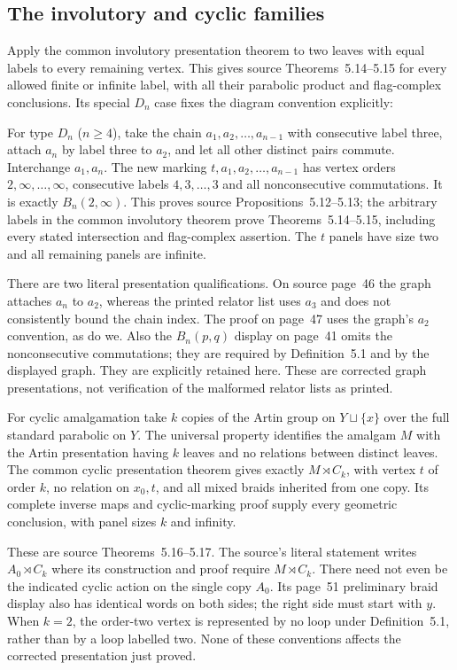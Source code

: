\subsection{The involutory and cyclic families}
Apply the common involutory presentation theorem to two leaves with equal labels to every remaining vertex. This gives source Theorems~5.14--5.15 for every allowed finite or infinite label, with all their parabolic product and flag-complex conclusions. Its special $D_n$ case fixes the diagram convention explicitly:

For type $D_n$ ($n\geq4$), take the chain $a_1,a_2,\ldots,a_{n-1}$
with consecutive label three, attach $a_n$ by label three to $a_2$,
and let all other distinct pairs commute. Interchange $a_1,a_n$.
The new marking $t,a_1,a_2,\ldots,a_{n-1}$ has vertex orders
$2,\infty,\ldots,\infty$, consecutive labels $4,3,\ldots,3$ and
all nonconsecutive commutations. It is exactly $B_n(2,\infty)$.
This proves source Propositions~5.12--5.13; the arbitrary labels in the common involutory theorem
prove Theorems~5.14--5.15, including every stated intersection and
flag-complex assertion. The $t$ panels have size two and all remaining
panels are infinite.

There are two literal presentation qualifications. On source page~46
the graph attaches $a_n$ to $a_2$, whereas the printed relator list
uses $a_3$ and does not consistently bound the chain index. The proof
on page~47 uses the graph's $a_2$ convention, as do we. Also the
$B_n(p,q)$ display on page~41 omits the nonconsecutive commutations;
they are required by Definition~5.1 and by the displayed graph. They
are explicitly retained here. These are corrected graph presentations,
not verification of the malformed relator lists as printed.


For cyclic amalgamation take $k$ copies of the Artin group on $Y\sqcup\{x\}$ over the full standard parabolic on $Y$. The universal property identifies the amalgam $M$ with the Artin presentation having $k$ leaves and no relations between distinct leaves. The common cyclic presentation theorem gives exactly $M\rtimes C_k$, with vertex $t$ of order $k$, no relation on $x_0,t$, and all mixed braids inherited from one copy. Its complete inverse maps and cyclic-marking proof supply every geometric conclusion, with panel sizes $k$ and infinity.

These are source Theorems~5.16--5.17. The source's literal statement
writes $A_0\rtimes C_k$ where its construction and proof require
$M\rtimes C_k$. There need not even be the indicated cyclic action
on the single copy $A_0$. Its page~51 preliminary braid display also
has identical words on both sides; the right side must start with
$y$. When $k=2$, the order-two vertex is represented by no loop under
Definition~5.1, rather than by a loop labelled two. None of these
conventions affects the corrected presentation just proved.



